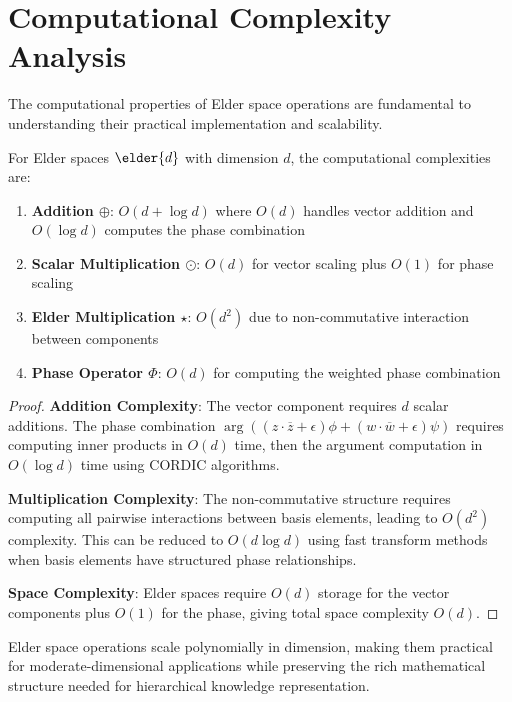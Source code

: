 \section{Computational Complexity Analysis}

The computational properties of Elder space operations are fundamental to understanding their practical implementation and scalability.

\begin{theorem}
For Elder spaces $\elder{d}$ with dimension $d$, the computational complexities are:
\begin{enumerate}
    \item \textbf{Addition $\oplus$}: $O(d + \log d)$ where $O(d)$ handles vector addition and $O(\log d)$ computes the phase combination
    \item \textbf{Scalar Multiplication $\odot$}: $O(d)$ for vector scaling plus $O(1)$ for phase scaling
    \item \textbf{Elder Multiplication $\star$}: $O(d^2)$ due to non-commutative interaction between components
    \item \textbf{Phase Operator $\Phi$}: $O(d)$ for computing the weighted phase combination
\end{enumerate}
\end{theorem}

\begin{proof}
\textbf{Addition Complexity}: The vector component requires $d$ scalar additions. The phase combination $\arg((z \cdot \overline{z} + \epsilon)\phi + (w \cdot \overline{w} + \epsilon)\psi)$ requires computing inner products in $O(d)$ time, then the argument computation in $O(\log d)$ time using CORDIC algorithms.

\textbf{Multiplication Complexity}: The non-commutative structure requires computing all pairwise interactions between basis elements, leading to $O(d^2)$ complexity. This can be reduced to $O(d \log d)$ using fast transform methods when basis elements have structured phase relationships.

\textbf{Space Complexity}: Elder spaces require $O(d)$ storage for the vector components plus $O(1)$ for the phase, giving total space complexity $O(d)$.
\end{proof}

\begin{corollary}
Elder space operations scale polynomially in dimension, making them practical for moderate-dimensional applications while preserving the rich mathematical structure needed for hierarchical knowledge representation.
\end{corollary}

